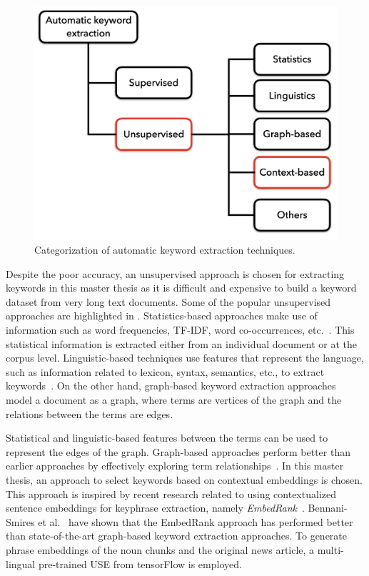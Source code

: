 \begin{figure}[h]
	\centering
	\includegraphics[width=.6\textwidth]{images/thesis_images/keyword_extraction_techniques.png}
	\caption[Keyword extraction techniques.]{Categorization of automatic keyword extraction techniques. \label{fig:keyword_extraction_techniques}}
\end{figure}

Despite the poor accuracy, an unsupervised approach is chosen for extracting keywords in this master thesis as it is difficult and expensive to build a keyword dataset from very long text documents. Some of the popular unsupervised approaches are highlighted in . Statistics-based approaches make use of information such as word frequencies, \ac{TF-IDF}, word co-occurrences, etc.~\cite{beliga2014keyword}. This statistical information is extracted either from an individual document or at the corpus level. Linguistic-based techniques use features that represent the language, such as information related to lexicon, syntax, semantics, etc., to extract keywords~\cite{beliga2014keyword}. On the other hand, graph-based keyword extraction approaches model a document as a graph, where terms are vertices of the graph and the relations between the terms are edges. 

Statistical and linguistic-based features between the terms can be used to represent the edges of the graph. Graph-based approaches perform better than earlier approaches by effectively exploring term relationships~\cite{beliga2014keyword}. In this master thesis, an approach to select keywords based on contextual embeddings is chosen. This approach is inspired by recent research related to using contextualized sentence embeddings for keyphrase extraction, namely \emph{EmbedRank}~\cite{bennani2018simple}. Bennani-Smires et al.~\cite{bennani2018simple} have shown that the EmbedRank approach has performed better than state-of-the-art graph-based keyword extraction approaches. To generate phrase embeddings of the noun chunks and the original news article, a multi-lingual pre-trained \ac{USE} from tensorFlow is employed. 


